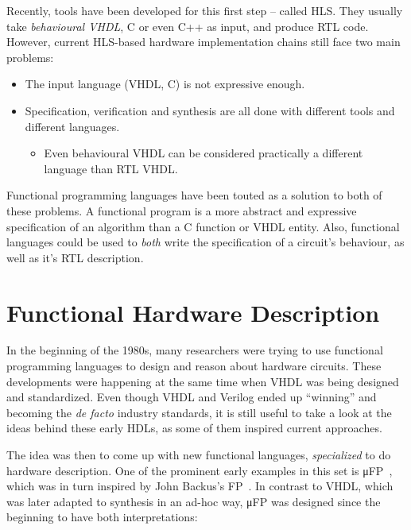         Recently, tools have been developed for this first step -- called \ac{HLS}.
        They usually take \emph{behavioural \acs{VHDL}}, C or even C++ as input, and produce \ac{RTL} code.
        However, current \acs{HLS}-based hardware implementation chains still face two main problems:

        \begin{itemize}
            \item The input language (VHDL, C) is not expressive enough.
            \item Specification, verification and synthesis are all done with different tools and different languages.
            \begin{itemize}
                \item Even behavioural \acs{VHDL} can be considered practically a different language
                    than \acl{RTL} \acs{VHDL}.
            \end{itemize}
        \end{itemize}

        Functional programming languages have been touted as a solution to both of these problems.
        A functional program is a more abstract and expressive specification of an algorithm than
        a C function or VHDL entity.
        Also, functional languages could be used to \emph{both} write the specification of a circuit's behaviour,
        as well as it's \acl{RTL} description.


    \section{Functional Hardware Description}
    \label{sec:functional-hardware}
        In the beginning of the 1980s, many researchers were trying to use functional programming languages
        to design and reason about hardware circuits.
        These developments were happening at the same time when \ac{VHDL} was being designed and standardized.
        Even though \ac{VHDL} and Verilog ended up ``winning'' and becoming the \emph{de facto} industry standards,
        it is still useful to take a look at the ideas behind these early \acp{HDL}, as some of them
        inspired current approaches.

        The idea was then to come up with new functional languages, \emph{specialized} to do hardware description.
        One of the prominent early examples in this set is μFP~\cite{mufp-1984},
        which was in turn inspired by John Backus's FP~\cite{backus-turing-lecture}.
        In contrast to \ac{VHDL}, which was later adapted to synthesis in an ad-hoc way,
        μFP was designed since the beginning to have both interpretations:

